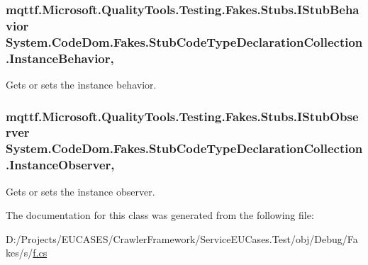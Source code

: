 \hypertarget{class_system_1_1_code_dom_1_1_fakes_1_1_stub_code_type_declaration_collection_a8e92886ff3246c9daa73f88bf251daee}{
\subsubsection[{Instance\-Behavior}]{\setlength{\rightskip}{0pt plus 5cm}mqttf.\-Microsoft.\-Quality\-Tools.\-Testing.\-Fakes.\-Stubs.\-I\-Stub\-Behavior System.\-Code\-Dom.\-Fakes.\-Stub\-Code\-Type\-Declaration\-Collection.\-Instance\-Behavior\hspace{0.3cm}{\ttfamily [get]}, {\ttfamily [set]}}}\label{class_system_1_1_code_dom_1_1_fakes_1_1_stub_code_type_declaration_collection_a8e92886ff3246c9daa73f88bf251daee}


Gets or sets the instance behavior.

\hypertarget{class_system_1_1_code_dom_1_1_fakes_1_1_stub_code_type_declaration_collection_ab515155ee4593454f1412e88131e82bf}{
\subsubsection[{Instance\-Observer}]{\setlength{\rightskip}{0pt plus 5cm}mqttf.\-Microsoft.\-Quality\-Tools.\-Testing.\-Fakes.\-Stubs.\-I\-Stub\-Observer System.\-Code\-Dom.\-Fakes.\-Stub\-Code\-Type\-Declaration\-Collection.\-Instance\-Observer\hspace{0.3cm}{\ttfamily [get]}, {\ttfamily [set]}}}\label{class_system_1_1_code_dom_1_1_fakes_1_1_stub_code_type_declaration_collection_ab515155ee4593454f1412e88131e82bf}


Gets or sets the instance observer.



The documentation for this class was generated from the following file\-:\begin{DoxyCompactItemize}
\item 
D\-:/\-Projects/\-E\-U\-C\-A\-S\-E\-S/\-Crawler\-Framework/\-Service\-E\-U\-Cases.\-Test/obj/\-Debug/\-Fakes/s/\hyperlink{s_2f_8cs}{f.\-cs}\end{DoxyCompactItemize}
